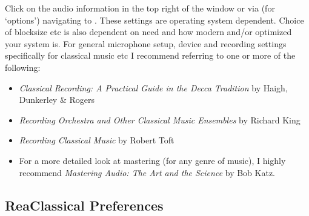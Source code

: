 \documentclass[10pt,american]{article}
\begin{document}
Click on the audio information in the top right of the window or via 
(for `options') navigating to . These settings are
operating system dependent. Choice of blocksize etc is also dependent on need
and how modern and/or optimized your system is. For general microphone setup,
device and recording settings specifically for classical music etc I recommend
referring to one or more of the following: 
\begin{itemize}
\item \emph{Classical Recording: A Practical Guide in the Decca
Tradition}\textsc{ }by Haigh, Dunkerley \& Rogers
\item \emph{Recording Orchestra and Other Classical Music Ensembles} by Richard
King
\item \emph{Recording Classical Music} by Robert Toft
\item For a more detailed look at mastering (for any genre of music), I highly
recommend \emph{Mastering Audio: The Art and the Science} by Bob Katz. 
\end{itemize}

\subsection{ReaClassical Preferences}
\end{document}
